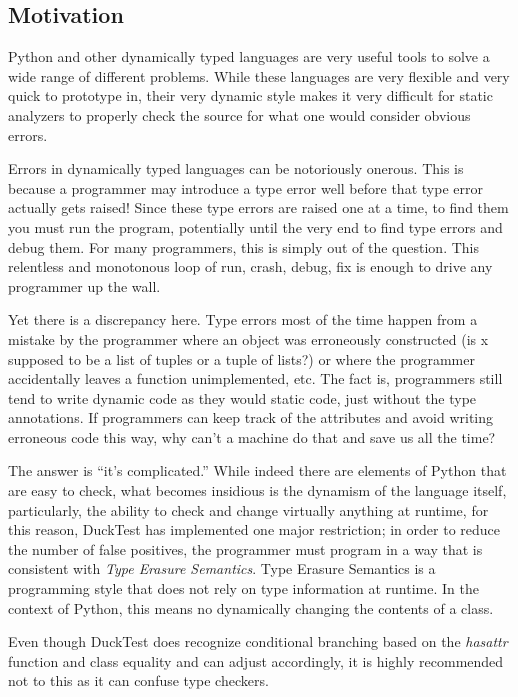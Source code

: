 \documentclass{scrartcl}
\begin{document}
\begin{multicols}{2}
\section*{Motivation}

Python and other dynamically typed languages are very useful tools to solve a
wide range of different problems. While these languages are very flexible and
very quick to prototype in, their very dynamic style makes it very difficult
for static analyzers to properly check the source for what one would consider
obvious errors.

Errors in dynamically typed languages can be notoriously onerous. This is
because a programmer may introduce a type error well before that type error
actually gets raised! Since these type errors are raised one at a time, to
find them you must run the program, potentially until the very end to find
type errors and debug them. For many programmers, this is simply out of the
question. This relentless and monotonous loop of run, crash, debug, fix is
enough to drive any programmer up the wall.

Yet there is a discrepancy here. Type errors most of the time happen from
a mistake by the programmer where an object was erroneously constructed (is
x supposed to be a list of tuples or a tuple of lists?) or where the programmer
accidentally leaves a function unimplemented, etc. The fact is, programmers
still tend to write dynamic code as they would static code, just without the
type annotations. If programmers can keep track of the attributes and avoid
writing erroneous code this way, why can't a machine do that and save us all
the time?

The answer is ``it's complicated.'' While indeed there are elements of Python
that are easy to check, what becomes insidious is the dynamism of the language
itself, particularly, the ability to check and change virtually anything at
runtime, for this reason, DuckTest has implemented one major restriction;
in order to reduce the number of false positives, the programmer must program
in a way that is consistent with \emph{Type Erasure Semantics}. Type Erasure
Semantics is a programming style that does not rely on type information at
runtime. In the context of Python, this means no dynamically changing the contents
of a class.

Even though DuckTest does recognize conditional branching based on the \emph{hasattr}
function and class equality and can adjust accordingly, it is highly recommended
not to this as it can confuse type checkers.


\end{multicols}
\end{document}
